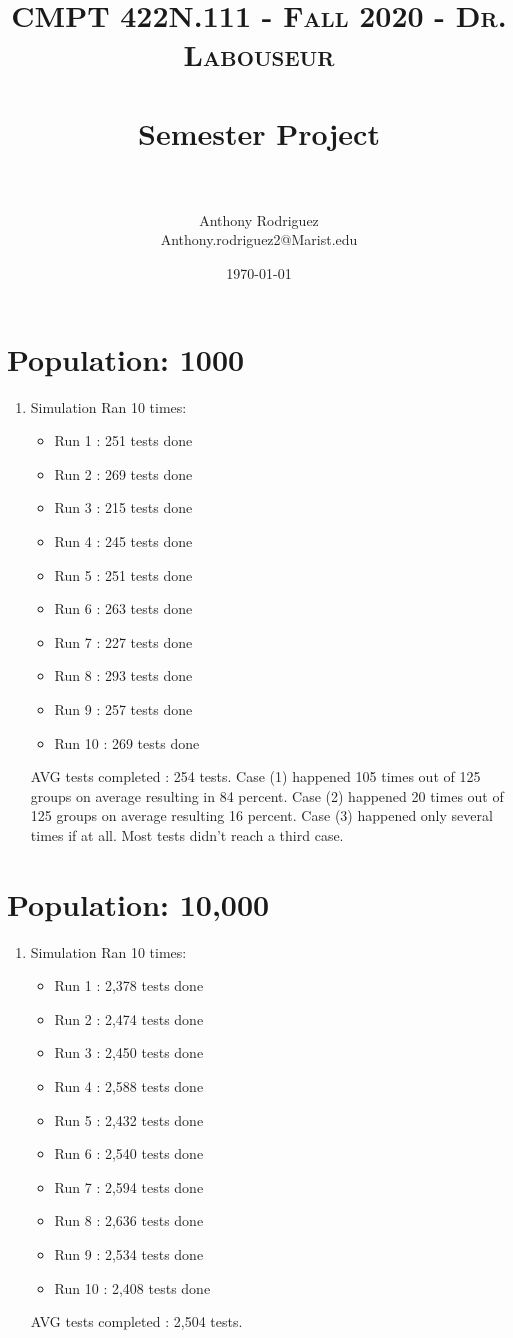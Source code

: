 \documentclass[letterpaper, 10pt,DIV=13]{scrartcl}
\title{	
   \normalfont \normalsize 
   \textsc{CMPT 422N.111 - Fall 2020 - Dr. Labouseur} \\[10pt] %
   \horrule{0.5pt} \\[0.25cm] 	%
   \huge Semester Project  \\     	    %
   \horrule{0.5pt} \\[0.25cm] 	%
}
\author{Anthony Rodriguez \\ \normalsize Anthony.rodriguez2@Marist.edu}
\date{\normalsize\today} 	%
\numberwithin{equation}{section} %
\numberwithin{figure}{section} %
\numberwithin{table}{section} %
\begin{document}
\maketitle %

\section{Population: 1000}
\bigskip

\begin{enumerate}
   \item Simulation Ran 10 times:
   \begin{itemize}
     \item Run 1 : 251 tests done
     \item Run 2 : 269 tests done
     \item Run 3 : 215 tests done
     \item Run 4 : 245 tests done
     \item Run 5 : 251 tests done
     \item Run 6 : 263 tests done
     \item Run 7 : 227 tests done
     \item Run 8 : 293 tests done
     \item Run 9 : 257 tests done
     \item Run 10 : 269 tests done
   \end{itemize}
   AVG tests completed : 254 tests. Case (1) happened 105 times out of 125 groups on average resulting in 84 percent. Case (2) happened 20 times out of 125 groups on average resulting 16 percent. Case (3) happened only several times if at all. Most tests didn't reach a third case. 
   \bigskip
\end {enumerate}
\section{Population: 10,000}
\bigskip

\begin{enumerate}
   \item Simulation Ran 10 times:
   \begin{itemize}
     \item Run 1 : 2,378 tests done
     \item Run 2 : 2,474 tests done
     \item Run 3 : 2,450 tests done
     \item Run 4 : 2,588 tests done
     \item Run 5 : 2,432 tests done
     \item Run 6 : 2,540 tests done
     \item Run 7 : 2,594 tests done
     \item Run 8 : 2,636 tests done
     \item Run 9 : 2,534 tests done
     \item Run 10 : 2,408 tests done
   \end{itemize}
   AVG tests completed : 2,504 tests. 
   \bigskip
\end {enumerate}
\end{document}
